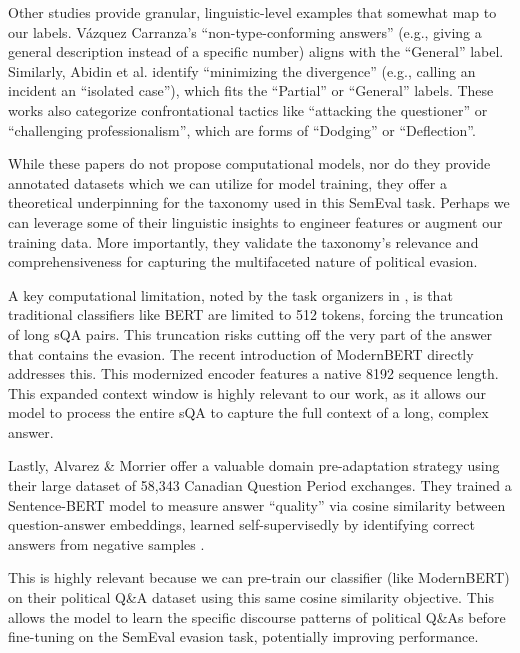 \documentclass[conference]{IEEEtran}
\begin{document}
Other studies provide granular, linguistic-level examples that somewhat map to our labels. Vázquez Carranza's \cite{b7} ``non-type-conforming answers'' (e.g., giving a general description instead of a specific number)  aligns  with the ``General'' label. Similarly, Abidin et al. identify ``minimizing the divergence'' (e.g., calling an incident an ``isolated case''), which fits the ``Partial'' or ``General'' labels. These works also categorize confrontational tactics like ``attacking the questioner'' or ``challenging professionalism'', which are forms of ``Dodging'' or ``Deflection''.

While these papers do not propose computational models, nor do they provide annotated datasets which we can utilize for model training, they offer a theoretical underpinning for the taxonomy used in this SemEval task. Perhaps we can leverage some of their linguistic insights to engineer features or augment our training data. More importantly, they validate the taxonomy's relevance and comprehensiveness for capturing the multifaceted nature of political evasion.

A key computational limitation, noted by the task organizers in \cite{b8}, is that traditional classifiers like BERT are limited to 512 tokens, forcing the truncation of long sQA pairs. This truncation risks cutting off the very part of the answer that contains the evasion. The recent introduction of ModernBERT  directly addresses this. This modernized encoder features a native 8192 sequence length. This expanded context window is highly relevant to our work, as it allows our model to process the entire sQA to capture the full context of a long, complex answer.

Lastly, Alvarez \& Morrier \cite{b9} offer a valuable domain pre-adaptation strategy using their large dataset of 58,343 Canadian Question Period exchanges. They trained a Sentence-BERT model to measure answer ``quality'' via cosine similarity between question-answer embeddings, learned self-supervisedly by identifying correct answers from negative samples .

This is highly relevant because we can pre-train our classifier (like ModernBERT) on their political Q\&A dataset using this same cosine similarity objective. This allows the model to learn the specific discourse patterns of political Q\&As before fine-tuning on the SemEval evasion task, potentially improving performance.


\end{document}
